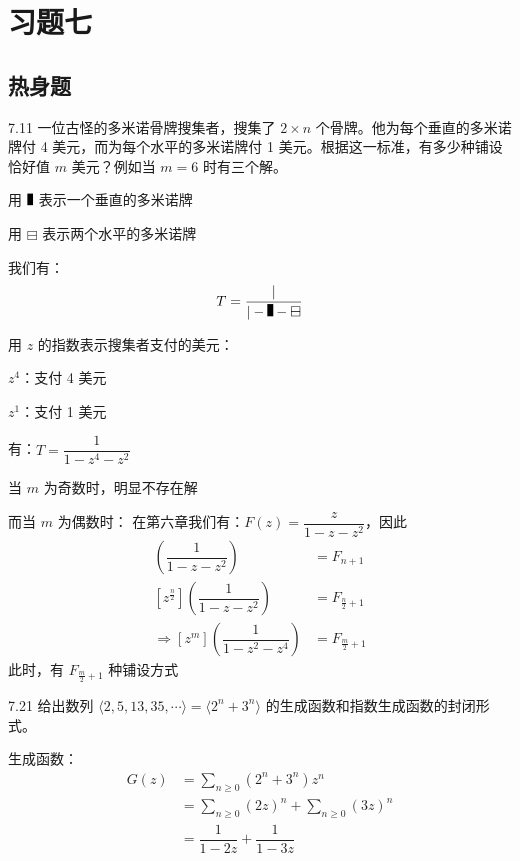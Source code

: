 \section{习题七}

\subsection{热身题}

\begin{problem}{7.1}{1}
  一位古怪的多米诺骨牌搜集者，搜集了 \( 2 \times n \) 个骨牌。他为每个垂直的多米诺牌付 4 美元，而为每个水平的多米诺牌付 1 美元。根据这一标准，有多少种铺设恰好值 \( m \) 美元？例如当 \( m=6 \) 时有三个解。
\end{problem}

用 \( \rule{1ex}{2ex} \) 表示一个垂直的多米诺牌

用 \( \boxminus \) 表示两个水平的多米诺牌

我们有：
\[
  T = \dfrac{|}{| - \rule{1ex}{2ex} - \boxminus}
\]

用 \( z \) 的指数表示搜集者支付的美元：

\( z^4 \)：支付 4 美元

\( z^1 \)：支付 1 美元

有：\( T = \dfrac{1}{1-z^4-z^2} \)

当 \( m \) 为奇数时，明显不存在解

而当 \( m \) 为偶数时：
在第六章我们有：\( F(z) = \dfrac{z}{1-z-z^2} \)，因此
\begin{align*}
  [z^n] \left( \dfrac{1}{1-z-z^2} \right) &= F_{n+1} \\
  [z^{\frac{n}{2}}] \left( \dfrac{1}{1-z-z^2} \right) &= F_{\frac{n}{2}+1} \\
  \Rightarrow [z^m] \left( \dfrac{1}{1-z^2-z^4} \right) &= F_{{\frac{m}{2}}+1}
\end{align*}
此时，有 \( F_{{\frac{m}{2}} + 1} \) 种铺设方式

\begin{problem}{7.2}{1}
  给出数列 \( \langle 2, 5, 13, 35, \cdots \rangle = \langle 2^n + 3^n \rangle \) 的生成函数和指数生成函数的封闭形式。
\end{problem}

生成函数：
\begin{align*}
  G(z) &= \sum_{n \geqslant 0} (2^n + 3^n) z^n \\
  &= \sum_{n \geqslant 0} (2z)^n + \sum_{n \geqslant 0} (3z)^n \\
  &= \dfrac{1}{1-2z} + \dfrac{1}{1-3z}
\end{align*}

